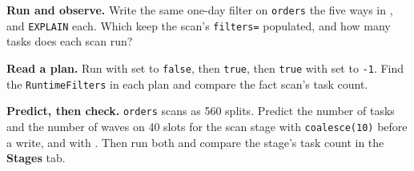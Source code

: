 \exercisehead
\begin{exercises}
\item \textbf{Run and observe.} Write the same one-day filter on \texttt{orders}
      the five ways in , and \texttt{EXPLAIN} each. Which
      keep the scan's \texttt{filters=} populated, and how many tasks does each
      scan run?
\item \textbf{Read a plan.} Run  with
       set to
      \texttt{false}, then \texttt{true}, then \texttt{true} with
       set to \texttt{-1}. Find the
      \texttt{RuntimeFilters} in each plan and compare the fact scan's task count.
\item \textbf{Predict, then check.} \texttt{orders} scans as 560 splits. Predict
      the number of tasks and the number of waves on 40 slots for the scan stage
      with \texttt{coalesce(10)} before a write, and with .
      Then run both and compare the stage's task count in the \textbf{Stages} tab.
\end{exercises}
